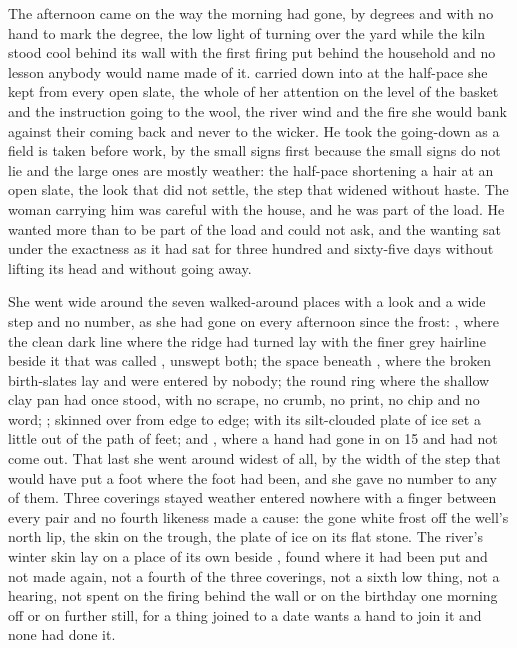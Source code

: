 The afternoon came on the way the morning had gone, by degrees and with no hand to mark the degree, the low light of  turning over the yard while the kiln stood cool behind its wall with the first firing put behind the household and no lesson anybody would name made of it.  carried  down into  at the half-pace she kept from every open slate, the whole of her attention on the level of the basket and the instruction going to the wool, the river wind and the fire she would bank against their coming back and never to the wicker. He took the going-down as a field is taken before work, by the small signs first because the small signs do not lie and the large ones are mostly weather: the half-pace shortening a hair at an open slate, the look that did not settle, the step that widened without haste. The woman carrying him was careful with the house, and he was part of the load. He wanted more than to be part of the load and could not ask, and the wanting sat under the exactness as it had sat for three hundred and sixty-five days without lifting its head and without going away.

She went wide around the seven walked-around places with a look and a wide step and no number, as she had gone on every afternoon since the frost: , where the clean dark line where the ridge had turned lay with the finer grey hairline beside it that was called , unswept both; the space beneath , where the broken birth-slates lay and were entered by nobody; the round ring where the shallow clay pan had once stood, with no scrape, no crumb, no print, no chip and no word; ;  skinned over from edge to edge;  with its silt-clouded plate of ice set a little out of the path of feet; and , where a hand had gone in on  15 and had not come out. That last she went around widest of all, by the width of the step that would have put a foot where the foot had been, and she gave no number to any of them. Three coverings stayed weather entered nowhere with a finger between every pair and no fourth likeness made a cause: the gone white frost off the well's north lip, the skin on the trough, the plate of ice on its flat stone. The river's winter skin lay on a place of its own beside , found where it had been put and not made again, not a fourth of the three coverings, not a sixth low thing, not a hearing, not spent on the firing behind the wall or on the birthday one morning off or on  further still, for a thing joined to a date wants a hand to join it and none had done it.

